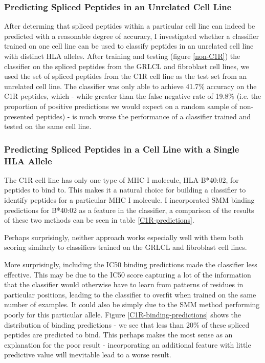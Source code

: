 \documentclass[10pt,a4paper,twoside,twocolumn]{article}
\begin{document}
\subsubsection*{Predicting Spliced Peptides in an Unrelated Cell Line}

After determing that spliced peptides within a particular cell line can indeed be predicted with a reasonable degree of accuracy, I investigated whether a classifier trained on one cell line can be used to classify peptides in an unrelated cell line with distinct HLA alleles. After training and testing (figure \ref{non-C1R}) the classifier on the spliced peptides from the GRLCL and fibroblast cell lines, we used the set of spliced peptides from the C1R cell line as the test set from an unrelated cell line. The classifier was only able to achieve 41.7\% accuracy on the C1R peptides, which - while greater than the false negative rate of 19.8\% (i.e. the proportion of positive predictions we would expect on a random sample of non-presented peptides) - is much worse the performance of a classifier trained and tested on the same cell line. 

\subsubsection*{Predicting Spliced Peptides in a Cell Line with a Single HLA Allele}

The C1R cell line has only one type of MHC-I molecule, HLA-B*40:02, for peptides to bind to. This makes it a natural choice for building a classifier to identify peptides for a particular MHC I molecule. I incorporated SMM binding predictions for B*40:02 as a feature in the classifier, a comparison of the results of these two methods can be seen in table \ref{C1R-predictions}.

Perhaps surprisingly, neither approach works especially well with them both scoring similarly to classifiers trained on the GRLCL and fibroblast cell lines. 

More surprisingly, including the IC50 binding predictions made the classifier less effective. This may be due to the IC50 score capturing a lot of the information that the classifier would otherwise have to learn from patterns of residues in particular positions, leading to the classifier to overfit when trained on the same number of examples. It could also be simply due to the SMM method performing poorly for this particular allele. Figure \ref{C1R-binding-predictions} shows the distribution of binding predictions - we see that less than 20\% of these spliced peptides are predicted to bind. This perhaps makes the most sense as an explanation for the poor result - incorporating an additional feature with little predictive value will inevitable lead to a worse result.
\end{document}
